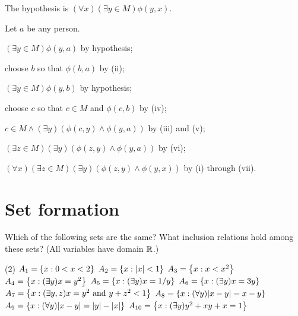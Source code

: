 \begin{solution}
The hypothesis is $(\forall x)(\exists y\in M)\phi(y, x)$.

\begin{enumroman}
    \item Let $a$ be any person.
    \item \quad $(\exists y\in M)\phi(y, a)$ \hfill by hypothesis;
    \item \quad choose $b$ so that $\phi(b,a)$ \hfill by (ii);
    \item \quad $(\exists y\in M)\phi(y, b)$ \hfill by hypothesis;
    \item \quad choose $c$ so that $c\in M$ and $\phi(c,b)$ \hfill by (iv);
    \item \quad $c\in M\land (\exists y)(\phi(c, y)\land \phi(y, a))$ \hfill by (iii) and (v);
    \item \quad $(\exists z\in M)(\exists y)(\phi(z,y)\land \phi(y, a))$ \hfill by (vi);
    \item $(\forall x)(\exists z\in M)(\exists y)(\phi(z,y)\land \phi(y, x))$ \hfill by (i) through (vii).
\end{enumroman}
\end{solution}

\section{Set formation}

\begin{exercise}
Which of the following sets are the same? What inclusion relations hold among
these sets? (All variables have domain $\mathbb{R}$.)

\begin{tasks}[label=](2)
    \task $A_1=\left\{ x : 0 < x <2 \right\}$
    \task $A_2=\left\{ x : \left\lvert x\right\rvert < 1 \right\}$
    \task $A_3=\left\{ x : x < x^2 \right\}$
    \task $A_4=\left\{ x : (\exists y)x=y^2 \right\}$
    \task $A_5=\left\{ x : (\exists y)x=1/y \right\}$
    \task $A_6=\left\{ x : (\exists y)x=3y \right\}$
    \task $A_7=\left\{ x : (\exists y,z)x=y^2 \text{ and } y+z^2 < 1 \right\}$
    \task $A_8=\setb{x}{(\forall y)\abs{x-y} = x - y}$
    \task $A_9=\setb{x}{(\forall y)\abs{x-y} = \abs{y} - \abs{x}}$
    \task $A_{10}=\left\{ x : (\exists y)y^2 + xy + x = 1 \right\}$
\end{tasks}
\end{exercise}

